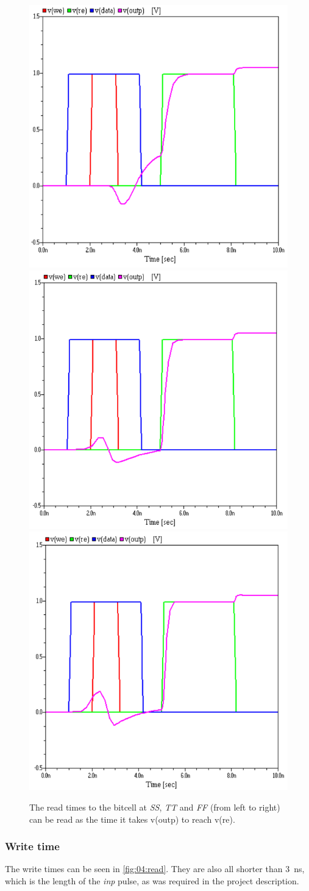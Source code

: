 \begin{figure}[H]
    \centering
    \includegraphics[width=0.3\linewidth]{aimSpice/plots/plotsSS/read.png}
    \includegraphics[width=0.3\linewidth]{aimSpice/plots/plotsTT/read.png}
    \includegraphics[width=0.3\linewidth]{aimSpice/plots/plotsFF/read.png}
    \caption{The read times to the bitcell at \textit{SS}, \textit{TT} and \textit{FF} (from left to right) can be read as the time it takes v(outp) to reach v(re).}
    \label{fig:04:read}
\end{figure}

\subsubsection{Write time}
The write times can be seen in \autoref{fig:04:read}. They are also all shorter than \SI{3}{ns}, which is the length of the \textit{inp} pulse, as was required in the project description.

